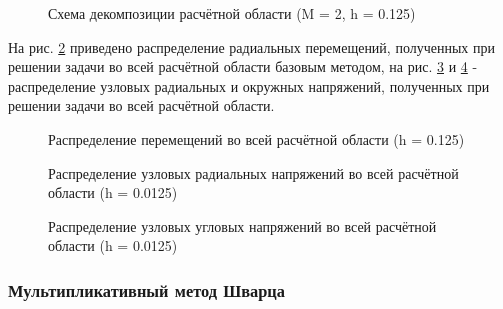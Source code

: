 \documentclass[a4paper, 14pt]{extarticle}
\newcommand{\area}{rectangle}
\newcommand{\task}{3_fixes}
\newcommand{\taskNum}{01}
\begin{document}
\begin{figure}[h]
\caption{Схема декомпозиции расчётной области (M = 2, h = 0.125)}
\label{fig:task_\taskNum_decomposition}
\end{figure}

\newpage

На рис. \ref{fig:task_\taskNum_basic_displacement_distribution} приведено распределение радиальных перемещений, полученных при решении задачи во всей расчётной области базовым методом, на рис. \ref{fig:task_\taskNum_basic_pressure_distribution_r} и \ref{fig:task_\taskNum_basic_pressure_distribution_phi} - распределение узловых радиальных и окружных напряжений, полученных при решении задачи во всей расчётной области.

\begin{figure}[h]
\caption{Распределение перемещений во всей расчётной области (h = 0.125)}
\label{fig:task_\taskNum_basic_displacement_distribution}
\end{figure}

\newpage

\begin{figure}[H]
\caption{Распределение узловых радиальных напряжений во всей расчётной области (h = 0.0125)}
\label{fig:task_\taskNum_basic_pressure_distribution_r}
\end{figure}
\begin{figure}[H]
\caption{Распределение узловых угловых напряжений во всей расчётной области (h = 0.0125)}
\label{fig:task_\taskNum_basic_pressure_distribution_phi}
\end{figure}

\newpage

\subsubsection{Мультипликативный метод Шварца}
\end{document}
